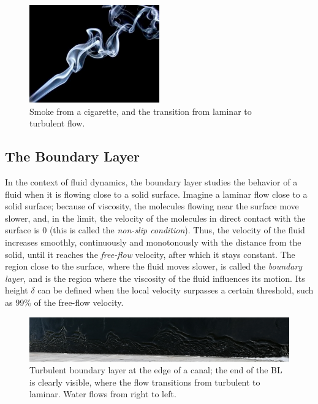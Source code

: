 \documentclass[12pt]{book}
\begin{document}
\begin{figure}
\caption{Smoke from a cigarette, and the transition from laminar to turbulent flow.}
\label{fig:smoke}
\centering
\includegraphics[width=0.5\textwidth]{images/smoke}
\end{figure}


\subsection{The Boundary Layer}
In the context of fluid dynamics, the boundary layer studies the behavior of a fluid when it is flowing close to a solid surface. Imagine a laminar flow close to a solid surface; because of viscosity, the molecules flowing near the surface move slower, and, in the limit, the velocity of the molecules in direct contact with the surface is 0 (this is called the \emph{non-slip condition}). Thus, the velocity of the fluid increases smoothly, continuously and monotonously with the distance from the solid, until it reaches the \emph{free-flow} velocity, after which it stays constant. The region close to the surface, where the fluid moves slower, is called the \emph{boundary layer}, and is the region where the viscosity of the fluid influences its motion. Its height $\delta$ can be defined when the local velocity surpasses a certain threshold, such as 99\% of the free-flow velocity.

\begin{figure}
\caption{Turbulent boundary layer at the edge of a canal; the end of the BL is clearly visible, where the flow transitions from turbulent to laminar. Water flows from right to left.}
\label{fig:bl}
\centering
\includegraphics[width=\textwidth]{images/bl}
\end{figure}
\end{document}
